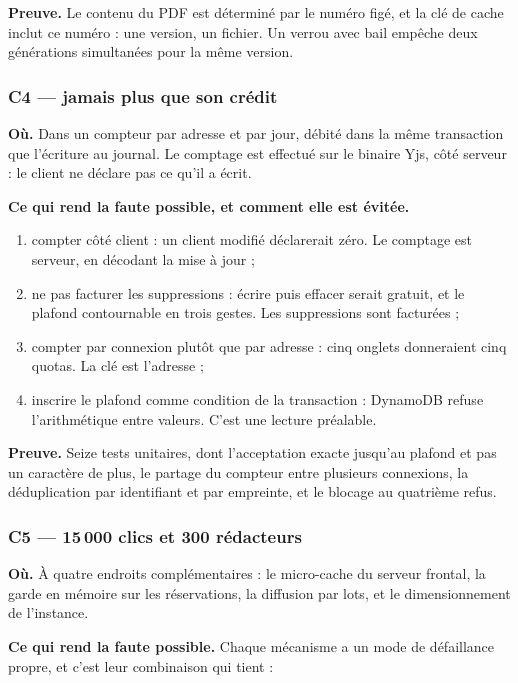 \textbf{Preuve.} Le contenu du PDF est déterminé par le numéro figé, et la clé de
cache inclut ce numéro : une version, un fichier. Un verrou avec bail empêche
deux générations simultanées pour la même version.

\subsubsection{C4 — jamais plus que son crédit}

\textbf{Où.} Dans un compteur par adresse et par jour, débité dans la même
transaction que l'écriture au journal. Le comptage est effectué sur le binaire
Yjs, côté serveur : le client ne déclare pas ce qu'il a écrit.

\textbf{Ce qui rend la faute possible, et comment elle est évitée.}

\begin{enumerate}[leftmargin=1.4em,itemsep=2pt]
  \item compter côté client : un client modifié déclarerait zéro. Le comptage
        est serveur, en décodant la mise à jour ;
  \item ne pas facturer les suppressions : écrire puis effacer serait gratuit, et
        le plafond contournable en trois gestes. Les suppressions sont facturées ;
  \item compter par connexion plutôt que par adresse : cinq onglets donneraient
        cinq quotas. La clé est l'adresse ;
  \item inscrire le plafond comme condition de la transaction : DynamoDB refuse
        l'arithmétique entre valeurs. C'est une lecture préalable.
\end{enumerate}

\textbf{Preuve.} Seize tests unitaires, dont l'acceptation exacte jusqu'au
plafond et pas un caractère de plus, le partage du compteur entre plusieurs
connexions, la déduplication par identifiant et par empreinte, et le blocage au
quatrième refus.

\subsubsection{C5 — 15\,000 clics et 300 rédacteurs}

\textbf{Où.} À quatre endroits complémentaires : le micro-cache du serveur
frontal, la garde en mémoire sur les réservations, la diffusion par lots, et le
dimensionnement de l'instance.

\textbf{Ce qui rend la faute possible.} Chaque mécanisme a un mode de défaillance
propre, et c'est leur combinaison qui tient :

